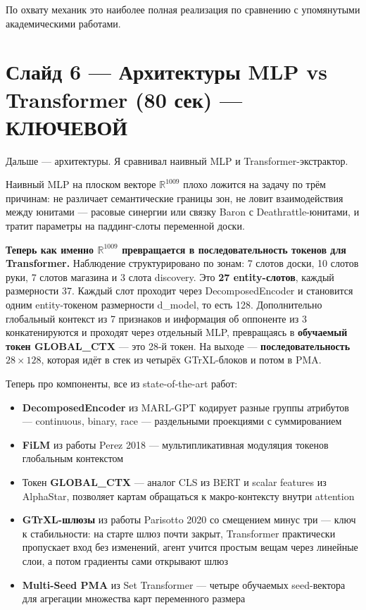 \documentclass[a4paper,12pt]{extarticle}
\begin{document}
По охвату механик это наиболее полная реализация по сравнению с упомянутыми академическими работами.

\section*{Слайд 6 --- Архитектуры MLP vs Transformer (80 сек) --- КЛЮЧЕВОЙ}

Дальше --- архитектуры. Я сравнивал наивный MLP и Transformer-экстрактор.

Наивный MLP на плоском векторе $\mathbb{R}^{1009}$ плохо ложится на задачу по трём причинам: не различает семантические границы зон, не ловит взаимодействия между юнитами --- расовые синергии или связку Baron с Deathrattle-юнитами, и тратит параметры на паддинг-слоты переменной доски.

\textbf{Теперь как именно $\mathbb{R}^{1009}$ превращается в последовательность токенов для Transformer.} Наблюдение структурировано по зонам: 7 слотов доски, 10 слотов руки, 7 слотов магазина и 3 слота discovery. Это \textbf{27 entity-слотов}, каждый размерности 37. Каждый слот проходит через DecomposedEncoder и становится одним entity-токеном размерности d\_model, то есть 128. Дополнительно глобальный контекст из 7 признаков и информация об оппоненте из 3 конкатенируются и проходят через отдельный MLP, превращаясь в \textbf{обучаемый токен GLOBAL\_CTX} --- это 28-й токен. На выходе --- \textbf{последовательность $28 \times 128$}, которая идёт в стек из четырёх GTrXL-блоков и потом в PMA.

Теперь про компоненты, все из state-of-the-art работ:
\begin{itemize}[noitemsep]
  \item \textbf{DecomposedEncoder} из MARL-GPT кодирует разные группы атрибутов --- continuous, binary, race --- раздельными проекциями с суммированием
  \item \textbf{FiLM} из работы Perez 2018 --- мультипликативная модуляция токенов глобальным контекстом
  \item Токен \textbf{GLOBAL\_CTX} --- аналог CLS из BERT и scalar features из AlphaStar, позволяет картам обращаться к макро-контексту внутри attention
  \item \textbf{GTrXL-шлюзы} из работы Parisotto 2020 со смещением минус три --- ключ к стабильности: на старте шлюз почти закрыт, Transformer практически пропускает вход без изменений, агент учится простым вещам через линейные слои, а потом градиенты сами открывают шлюз
  \item \textbf{Multi-Seed PMA} из Set Transformer --- четыре обучаемых seed-вектора для агрегации множества карт переменного размера
\end{itemize}
\end{document}
